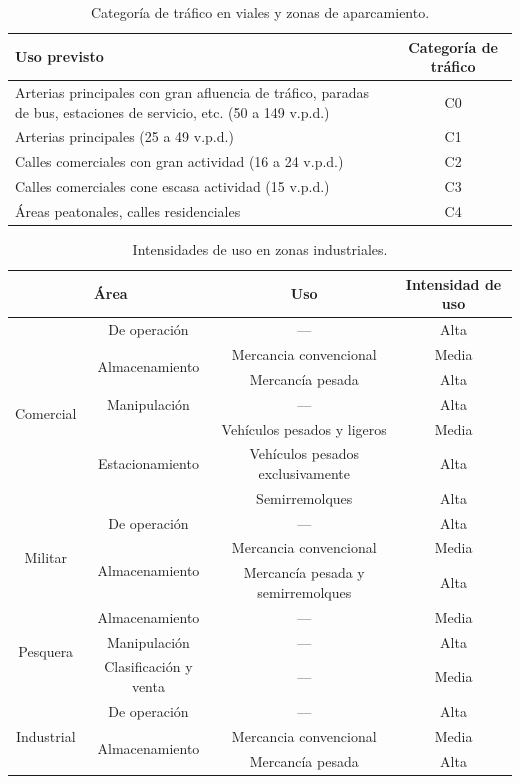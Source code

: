 \begin{table}[!htb]
\centering
\begin{tabular}{p{7cm}c}
\toprule
Uso previsto & Categoría de tráfico\\
\midrule
Arterias principales con gran afluencia de tráfico, paradas de bus, estaciones de servicio, etc. (50 a 149 v.p.d.) & C0\\
Arterias principales (25 a 49 v.p.d.) & C1\\
Calles comerciales con gran actividad (16 a 24 v.p.d.) & C2\\
Calles comerciales cone escasa actividad (15 v.p.d.) & C3\\
Áreas peatonales, calles residenciales & C4\\
\bottomrule
\end{tabular}
\caption{Categoría de tráfico en viales y zonas de aparcamiento.}
\label{categoriadetraficoenviales}
\end{table}

\begin{table}[!htb]
\centering
\begin{tabular}{cccc}
\toprule
\multicolumn{2}{c}{Área} & Uso & Intensidad de uso\\
\midrule
\multirow{7}{*}{Comercial} & De operación & — & Alta\\
& \multirow{2}{*}{Almacenamiento} & Mercancia convencional & Media\\
& & Mercancía pesada & Alta\\
& Manipulación & — & Alta\\
& \multirow{3}{*}{Estacionamiento} & Vehículos pesados y ligeros & Media\\
& & Vehículos pesados exclusivamente & Alta\\
& & Semirremolques & Alta\\
\midrule
\multirow{3}{*}{Militar} & De operación & — & Alta\\
& \multirow{2}{*}{Almacenamiento} & Mercancia convencional & Media\\
& & Mercancía pesada y semirremolques & Alta\\
\midrule
\multirow{3}{*}{Pesquera} & Almacenamiento & — & Media\\
& Manipulación & — & Alta\\
& Clasificación y venta & — & Media\\
\midrule
\multirow{3}{*}{Industrial} & De operación & — & Alta\\
& \multirow{2}{*}{Almacenamiento} & Mercancia convencional & Media\\
& & Mercancía pesada & Alta\\
\bottomrule
\end{tabular}
\caption{Intensidades de uso en zonas industriales.}
\label{categoriadetraficoenzonasindustrialesintensidades}
\end{table}

